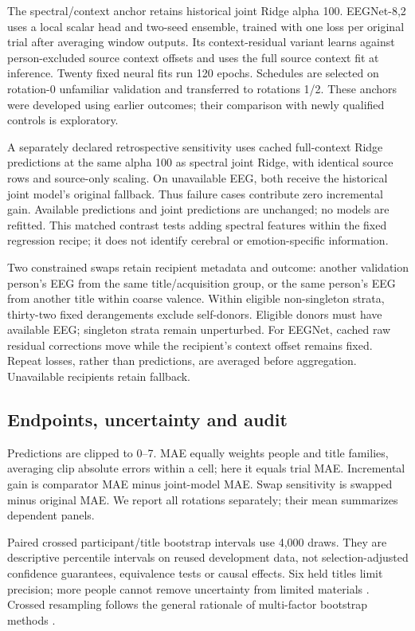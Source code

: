 \documentclass[11pt,a4paper]{article}
\begin{document}
The spectral/context anchor retains historical joint Ridge alpha 100. EEGNet-8,2 uses a local scalar head and two-seed ensemble, trained with one loss per original trial after averaging window outputs. Its context-residual variant learns against person-excluded source context offsets and uses the full source context fit at inference. Twenty fixed neural fits run 120 epochs. Schedules are selected on rotation-0 unfamiliar validation and transferred to rotations 1/2. These anchors were developed using earlier outcomes; their comparison with newly qualified controls is exploratory.

A separately declared retrospective sensitivity uses cached full-context Ridge predictions at the same alpha 100 as spectral joint Ridge, with identical source rows and source-only scaling. On unavailable EEG, both receive the historical joint model's original fallback. Thus failure cases contribute zero incremental gain. Available predictions and joint predictions are unchanged; no models are refitted. This matched contrast tests adding spectral features within the fixed regression recipe; it does not identify cerebral or emotion-specific information.

Two constrained swaps retain recipient metadata and outcome: another validation person's EEG from the same title/acquisition group, or the same person's EEG from another title within coarse valence. Within eligible non-singleton strata, thirty-two fixed derangements exclude self-donors. Eligible donors must have available EEG; singleton strata remain unperturbed. For EEGNet, cached raw residual corrections move while the recipient's context offset remains fixed. Repeat losses, rather than predictions, are averaged before aggregation. Unavailable recipients retain fallback.

\subsection{Endpoints, uncertainty and audit}
Predictions are clipped to 0--7. MAE equally weights people and title families, averaging clip absolute errors within a cell; here it equals trial MAE. Incremental gain is comparator MAE minus joint-model MAE. Swap sensitivity is swapped minus original MAE. We report all rotations separately; their mean summarizes dependent panels.

Paired crossed participant/title bootstrap intervals use 4,000 draws. They are descriptive percentile intervals on reused development data, not selection-adjusted confidence guarantees, equivalence tests or causal effects. Six held titles limit precision; more people cannot remove uncertainty from limited materials \cite{westfall2014power}. Crossed resampling follows the general rationale of multi-factor bootstrap methods \cite{owen2007,owen2012}.
\end{document}
